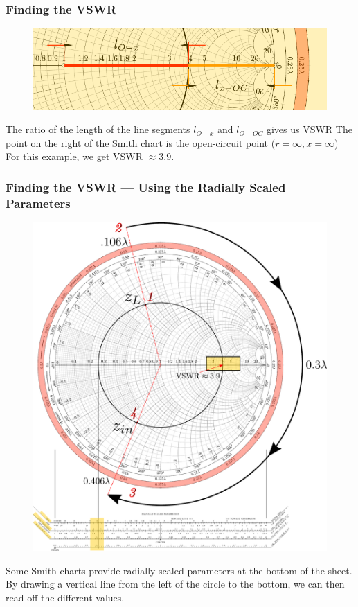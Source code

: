 \documentclass[10pt, compress]{beamer}
\begin{document}
\begin{frame}
    \frametitle{Finding the VSWR}
    \begin{figure}[T!]
        \centering
        \includegraphics[width=.95\textwidth]{smith example VSWR cropped.pdf}
    \end{figure}
    \begin{outline}
        \1 The ratio of the length of the line segments $l_{O - x}$ and $l_{O - OC}$ gives us VSWR
        \1 The point on the right of the Smith chart is the open-circuit point ($r = \infty, x = \infty$)
        \1 For this example, we get VSWR $\approx 3.9$.
    \end{outline}

\end{frame}

\begin{frame}
    \frametitle{Finding the VSWR — Using the Radially Scaled Parameters}
    \begin{figure}[T!]
        \centering
        \includegraphics[width=.50\textwidth]{smith example VSWR2.pdf}
    \end{figure}
    \begin{outline}
        \1 Some Smith charts provide radially scaled parameters at the bottom of the sheet.
        \1 By drawing a vertical line from the left of the circle to the bottom, we can then read off the different values.
    \end{outline}
\end{frame}
\end{document}
